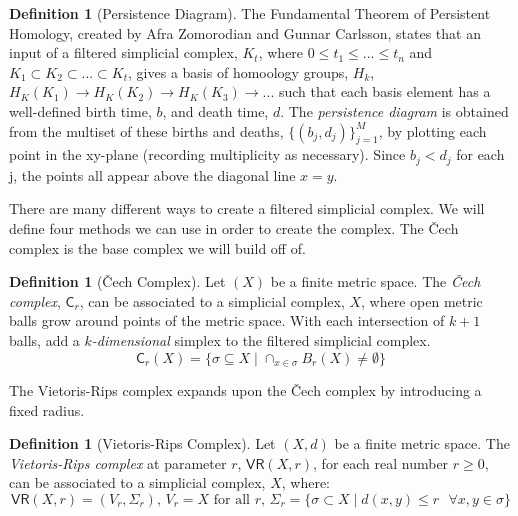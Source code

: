 \documentclass[ma]{uncgdissertationexp}
\theoremstyle{plain}
\theoremstyle{definition}
\newtheorem{definition}[theorem]{Definition}
\theoremstyle{remark}
\begin{document}
\begin{definition}[Persistence Diagram]
The Fundamental Theorem of Persistent Homology, created by Afra Zomorodian and Gunnar Carlsson\cite{computpershom}, states that an input of a filtered simplicial complex, $K_t$, where $0\leq t_{1} \leq ... \leq t_{n} $ and $K_{1} \subset K_{2} \subset ... \subset K_{t}$, gives a basis of homoology groups, $H_{k}$, $H_{K}(K_{1}) \rightarrow H_{K}(K_{2}) \rightarrow H_{K}(K_{3}) \rightarrow ...$ such that each basis element has a well-defined birth time, $b$, and death time, $d$. The \textit{persistence diagram} is obtained from the multiset of these births and deaths, $\{(b_{j},d_{j})\}^{M}_{j=1}$, by plotting each point in the xy-plane (recording multiplicity as necessary). Since $b_{j} < d_{j}$ for each j, the points all appear above the diagonal line $x=y$.
\end{definition}

\par There are many different ways to create a filtered simplicial complex. We will define four methods we can use in order to create the complex. The Čech complex is the base complex we will build off of.

\begin{definition}[Čech Complex]
Let $(X)$ be a finite metric space. The \textit{Čech complex}, $\mathsf{C}_r$, can be associated to a simplicial complex, $X$, where open metric balls grow around points of the metric space. With each intersection of $k+1$ balls, add a $k$\textit{-dimensional} simplex to the filtered simplicial complex.\\
$$\mathsf{C}_{r}(X) = \{\sigma \subseteq X \mid \cap_{x \in \sigma} B_{r}(X) \not= \emptyset\}$$
\end{definition}

\par The Vietoris-Rips complex expands upon the Čech complex by introducing a fixed radius.

\begin{definition}[Vietoris-Rips Complex]
Let $(X, d)$ be a finite metric space. The \textit{Vietoris-Rips complex} at parameter $r$, $\mathsf{VR}(X, r)$, for each real number $r\geq0$, can be associated to a simplicial complex, $X$, where:
$$\mathsf{VR}(X, r) = (V_{r}, \Sigma_{r})\text{, }V_{r}=X\text{ for all }r\text{, }\Sigma_{r} = \{\sigma \subset X \mid d(x,y) \leq r\text{ }\forall x, y \in \sigma\}$$
\end{definition}
\end{document}
